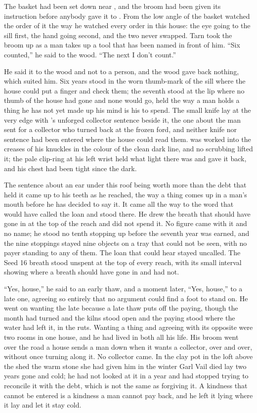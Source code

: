 The basket had been set down near , and the broom had been given its instruction before anybody gave it to . From the low angle of the basket  watched the order of it the way he watched every order in this house: the eye going to the sill first, the hand going second, and the two never swapped. Tarn took the broom up as a man takes up a tool that has been named in front of him. “Six counted,” he said to the wood. “The next I don't count.”

He said it to the wood and not to a person, and the wood gave back nothing, which suited him. Six years stood in the worn thumb-mark of the sill where the house could put a finger and check them; the seventh stood at the lip where no thumb of the house had gone and none would go, held the way a man holds a thing he has not yet made up his mind is his to spend. The small knife lay at the very edge with 's unforged collector sentence beside it, the one about the man sent for a collector who turned back at the frozen ford, and neither knife nor sentence had been entered where the house could read them.  was worked into the creases of his knuckles in the colour of the clean dark line, and no scrubbing lifted it; the pale clip-ring at his left wrist held what light there was and gave it back, and his chest had been tight since the dark.

The sentence about an ear under this roof being worth more than the debt that held it came up to his teeth as he reached, the way a thing comes up in a man's mouth before he has decided to say it. It came all the way to the word that would have called the loan and stood there. He drew the breath that should have gone in at the top of the reach and did not spend it. No figure came with it and no name; he stood no tenth stopping up before the seventh year was earned, and the nine stoppings stayed nine objects on a tray that could not be seen, with no payer standing to any of them. The loan that could hear stayed uncalled. The Seed 16 breath stood unspent at the top of every reach, with its small interval showing where a breath should have gone in and had not.

“Yes, house,” he said to an early thaw, and a moment later, “Yes, house,” to a late one, agreeing so entirely that no argument could find a foot to stand on. He went on wanting the late because a late thaw puts off the paying, though the month had turned and the kilns stood open and the paying stood where the water had left it, in the ruts. Wanting a thing and agreeing with its opposite were two rooms in one house, and he had lived in both all his life. His broom went over the road a house sends a man down when it wants a collector, over and over, without once turning along it. No collector came. In the clay pot in the loft above the shed the warm stone she had given him in the winter Garl Vail died lay two years gone and cold; he had not looked at it in a year and had stopped trying to reconcile it with the debt, which is not the same as forgiving it. A kindness that cannot be entered is a kindness a man cannot pay back, and he left it lying where it lay and let it stay cold.

